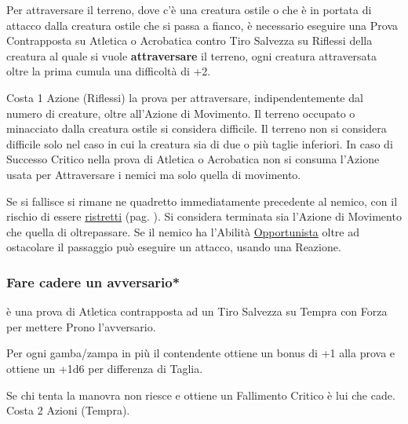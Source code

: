 \begin{multicols}{2}
Per attraversare il terreno, dove c'è una creatura ostile o che è in portata di attacco dalla creatura ostile che si passa a fianco, è necessario eseguire una Prova Contrapposta su Atletica o Acrobatica contro Tiro Salvezza su Riflessi della creatura al quale si vuole \textbf{attraversare} il terreno, ogni creatura attraversata oltre la prima cumula una difficoltà di +2.

Costa 1 Azione (Riflessi) la prova per attraversare, indipendentemente dal numero di creature, oltre all'Azione di Movimento. Il terreno occupato o minacciato dalla creatura ostile si considera difficile. Il terreno non si considera difficile solo nel caso in cui la creatura sia di due o più taglie inferiori. In caso di Successo Critico nella prova di Atletica o Acrobatica non si consuma l'Azione usata per Attraversare i nemici ma solo quella di movimento.

Se si fallisce si rimane ne quadretto immediatamente precedente al nemico, con il rischio di essere \hyperlink{ristretti}{ristretti} (pag. \pageref{ristretti}). Si considera terminata sia l'Azione di Movimento che quella di oltrepassare.
Se il nemico ha l'Abilità \hyperlink{opportunista}{Opportunista} oltre ad ostacolare il passaggio può eseguire un attacco, usando una Reazione.

%

\subsubsection{Fare cadere un avversario*} \label{farecadereavversario}\hypertarget{farecadereavversario}{}

è una prova di Atletica contrapposta ad un Tiro Salvezza su Tempra con Forza per mettere Prono l'avversario.

Per ogni gamba/zampa in più il contendente ottiene un bonus di +1 alla prova e ottiene un +1d6 per differenza di Taglia.

Se chi tenta la manovra non riesce e ottiene un Fallimento Critico è lui che cade. Costa 2 Azioni (Tempra).



\end{multicols}

